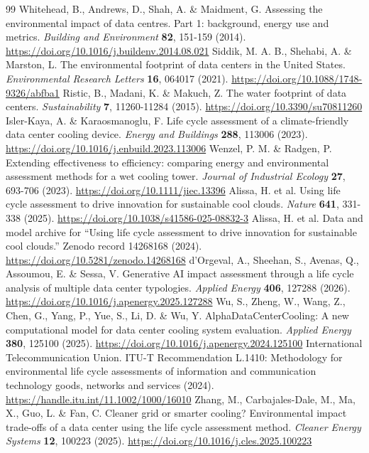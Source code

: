 \documentclass[review,12pt]{elsarticle}
\begin{document}
\begin{thebibliography}{99}
 Whitehead, B., Andrews, D., Shah, A. \& Maidment, G. Assessing the environmental impact of data centres. Part 1: background, energy use and metrics. \textit{Building and Environment} \textbf{82}, 151-159 (2014). \url{https://doi.org/10.1016/j.buildenv.2014.08.021}
 Siddik, M. A. B., Shehabi, A. \& Marston, L. The environmental footprint of data centers in the United States. \textit{Environmental Research Letters} \textbf{16}, 064017 (2021). \url{https://doi.org/10.1088/1748-9326/abfba1}
 Ristic, B., Madani, K. \& Makuch, Z. The water footprint of data centers. \textit{Sustainability} \textbf{7}, 11260-11284 (2015). \url{https://doi.org/10.3390/su70811260}
 Isler-Kaya, A. \& Karaosmanoglu, F. Life cycle assessment of a climate-friendly data center cooling device. \textit{Energy and Buildings} \textbf{288}, 113006 (2023). \url{https://doi.org/10.1016/j.enbuild.2023.113006}
 Wenzel, P. M. \& Radgen, P. Extending effectiveness to efficiency: comparing energy and environmental assessment methods for a wet cooling tower. \textit{Journal of Industrial Ecology} \textbf{27}, 693-706 (2023). \url{https://doi.org/10.1111/jiec.13396}
 Alissa, H. et al. Using life cycle assessment to drive innovation for sustainable cool clouds. \textit{Nature} \textbf{641}, 331-338 (2025). \url{https://doi.org/10.1038/s41586-025-08832-3}
 Alissa, H. et al. Data and model archive for ``Using life cycle assessment to drive innovation for sustainable cool clouds.'' Zenodo record 14268168 (2024). \url{https://doi.org/10.5281/zenodo.14268168}
 d'Orgeval, A., Sheehan, S., Avenas, Q., Assoumou, E. \& Sessa, V. Generative AI impact assessment through a life cycle analysis of multiple data center typologies. \textit{Applied Energy} \textbf{406}, 127288 (2026). \url{https://doi.org/10.1016/j.apenergy.2025.127288}
 Wu, S., Zheng, W., Wang, Z., Chen, G., Yang, P., Yue, S., Li, D. \& Wu, Y. AlphaDataCenterCooling: A new computational model for data center cooling system evaluation. \textit{Applied Energy} \textbf{380}, 125100 (2025). \url{https://doi.org/10.1016/j.apenergy.2024.125100}
 International Telecommunication Union. ITU-T Recommendation L.1410: Methodology for environmental life cycle assessments of information and communication technology goods, networks and services (2024). \url{https://handle.itu.int/11.1002/1000/16010}
 Zhang, M., Carbajales-Dale, M., Ma, X., Guo, L. \& Fan, C. Cleaner grid or smarter cooling? Environmental impact trade-offs of a data center using the life cycle assessment method. \textit{Cleaner Energy Systems} \textbf{12}, 100223 (2025). \url{https://doi.org/10.1016/j.cles.2025.100223}

\end{thebibliography}
\end{document}
